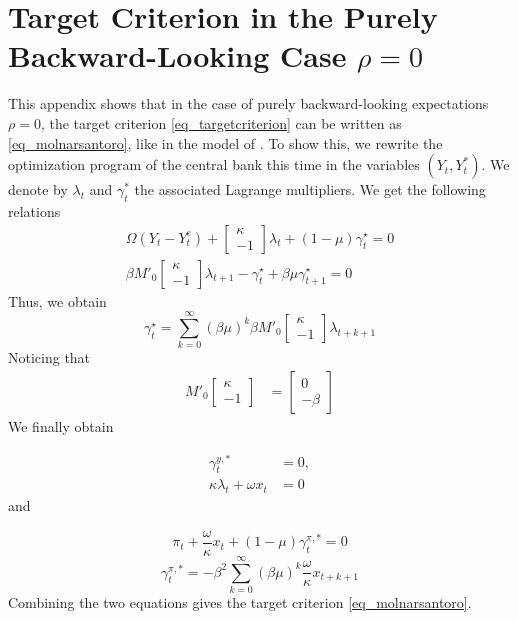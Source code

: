\section{Target Criterion in the Purely Backward-Looking Case $\rho=0$}\label{appendix_case_rho0}
This appendix shows that in the case of purely backward-looking expectations $\rho=0$, the target criterion \eqref{eq_targetcriterion} can be written as \eqref{eq_molnarsantoro}, like in the model of \cite{MolnarSantoro2014}.
To show this, we rewrite the optimization program of the central bank this time in the variables $(Y_t,Y_t^*)$. We denote by $\lambda_t$ and $\gamma^*_t$ the associated Lagrange multipliers. We get the following relations
\begin{align*}
\Omega(Y_t-Y_t^e)+\left[\begin{array}{c}\kappa\\-1\end{array}\right]\lambda_t+(1-\mu)\gamma_t^{\star}=0\\
\beta M'_0\left[\begin{array}{c}\kappa\\-1\end{array}\right]\lambda_{t+1}-\gamma_t^{\star}+\beta\mu \gamma_{t+1}^{\star}=0
\end{align*}
Thus, we obtain 
\begin{equation*}
\gamma_t^{\star}=\sum\limits_{k=0}^{\infty}(\beta\mu)^k \beta M'_0 \left[\begin{array}{c}\kappa\\-1\end{array}\right]\lambda_{t+k+1}
\end{equation*}
Noticing that 
\begin{align*}
M'_0 \left[\begin{array}{c}\kappa\\-1\end{array}\right]&= \left[\begin{array}{c}0\\-\beta\end{array}\right]
\end{align*}
We finally obtain 
 
\begin{align*}
\gamma_t^{y,*}&=0,\\
\kappa\lambda_t+\omega x_t&=0
\end{align*}
and 

\begin{equation*}
\pi_t+\frac{\omega}{\kappa}x_t+(1-\mu)\gamma_t^{\pi,*}=0
\end{equation*}
\begin{equation*}
\gamma_t^{\pi,*}=-\beta^2 \sum\limits_{k=0}^{\infty}(\beta\mu)^k \frac{\omega}{\kappa}x_{t+k+1}
\end{equation*}
Combining the two equations gives the target criterion \eqref{eq_molnarsantoro}.

